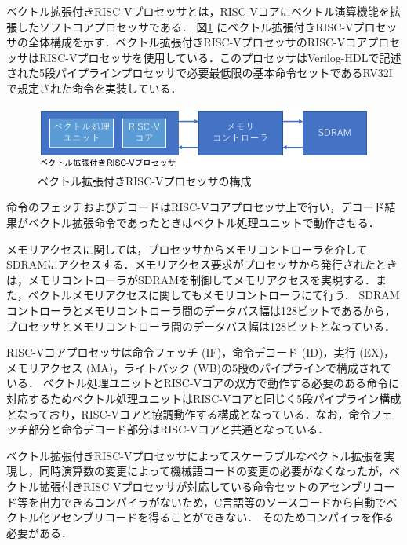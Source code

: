 ベクトル拡張付きRISC-Vプロセッサとは，RISC-Vコアにベクトル演算機能を拡張したソフトコアプロセッサである．
図\ref{fig:MIQS_system}
にベクトル拡張付きRISC-Vプロセッサの全体構成を示す．ベクトル拡張付きRISC-VプロセッサのRISC-VコアプロセッサはRISC-Vプロセッサを使用している．このプロセッサはVerilog-HDLで記述された5段パイプラインプロセッサで必要最低限の基本命令セットであるRV32Iで規定された命令を実装している．

\begin{figure}[b]
\begin{center}
    \includegraphics[scale=1.2]{image/MIQS_system.pdf}
    \caption{ベクトル拡張付きRISC-Vプロセッサの構成}
    \label{fig:MIQS_system}
\end{center}
\end{figure}

命令のフェッチおよびデコードはRISC-Vコアプロセッサ上で行い，デコード結果がベクトル拡張命令であったときはベクトル処理ユニットで動作させる．

メモリアクセスに関しては，プロセッサからメモリコントローラを介してSDRAMにアクセスする．メモリアクセス要求がプロセッサから発行されたときは，メモリコントローラがSDRAMを制御してメモリアクセスを実現する．また，ベクトルメモリアクセスに関してもメモリコントローラにて行う．
SDRAMコントローラとメモリコントローラ間のデータバス幅は128ビットであるから，プロセッサとメモリコントローラ間のデータバス幅は128ビットとなっている．

RISC-Vコアプロセッサは命令フェッチ (IF)，命令デコード (ID)，実行 (EX)，メモリアクセス (MA)，ライトバック (WB)の5段のパイプラインで構成されている．
ベクトル処理ユニットとRISC-Vコアの双方で動作する必要のある命令に対応するためベクトル処理ユニットはRISC-Vコアと同じく5段パイプライン構成となっており，RISC-Vコアと協調動作する構成となっている．なお，命令フェッチ部分と命令デコード部分はRISC-Vコアと共通となっている．

ベクトル拡張付きRISC-Vプロセッサによってスケーラブルなベクトル拡張を実現し，同時演算数の変更によって機械語コードの変更の必要がなくなったが，ベクトル拡張付きRISC-Vプロセッサが対応している命令セットのアセンブリコード等を出力できるコンパイラがないため，C言語等のソースコードから自動でベクトル化アセンブリコードを得ることができない．
そのためコンパイラを作る必要がある．